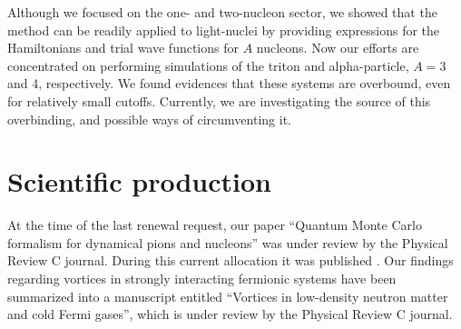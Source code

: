 \documentclass[12pt,letterpaper]{article}
\begin{document}
Although we focused on the one- and two-nucleon sector,
we showed that the method can be readily applied to light-nuclei
by providing expressions for the Hamiltonians and trial wave functions
for $A$ nucleons. Now our efforts are concentrated on performing
simulations of the triton and alpha-particle, $A=3$ and 4, respectively.
We found evidences that these systems are overbound, even for
relatively small cutoffs. Currently, we are investigating the source
of this overbinding, and possible ways of circumventing it.

\section{Scientific production}

At the time of the last renewal request,
our paper
``Quantum Monte Carlo formalism for dynamical pions and nucleons''
was under review by the
Physical 
Review C journal. During this current allocation it was published \cite{mad18}.
Our findings regarding
vortices in strongly interacting fermionic systems
have been summarized into a manuscript entitled
``Vortices in
low-density neutron matter and cold Fermi gases''\cite{madeira19},
which is
under review by the Physical
Review C journal.



\end{document}
